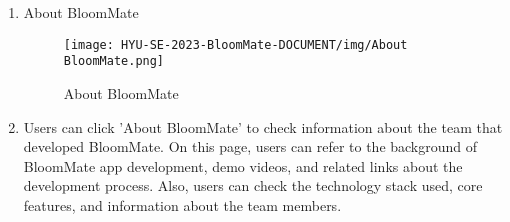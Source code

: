 \documentclass[conference, a4paper]{IEEEtran}
\begin{document}
\begin{enumerate}
    \item About BloomMate
        \begin{figure}[h]
        \centerline{
            \texttt{[image: HYU-SE-2023-BloomMate-DOCUMENT/img/About BloomMate.png]}
        }
        \label{fig}
        \caption{About BloomMate}
        \end{figure}
    \item[]Users can click 'About BloomMate' to check information about the team that developed BloomMate. On this page, users can refer to the background of BloomMate app development, demo videos, and related links about the development process. Also, users can check the technology stack used, core features, and information about the team members.
\end{enumerate}


\end{document}

